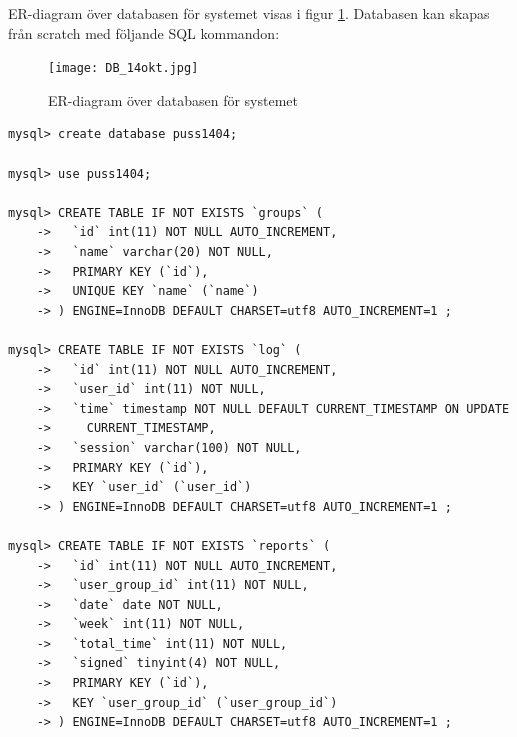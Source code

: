 \documentclass[a4paper]{article}
\begin{document}
ER-diagram över databasen för systemet visas i figur \ref{ER}. Databasen kan skapas från scratch med följande SQL kommandon: \\

\begin{figure}[ht!]
\centering
\texttt{[image: DB\_14okt.jpg]}
\caption{ER-diagram över databasen för systemet \label{ER}}
\end{figure}

\begin{lstlisting}
mysql> create database puss1404;

mysql> use puss1404;

mysql> CREATE TABLE IF NOT EXISTS `groups` (
    ->   `id` int(11) NOT NULL AUTO_INCREMENT,
    ->   `name` varchar(20) NOT NULL,
    ->   PRIMARY KEY (`id`),
    ->   UNIQUE KEY `name` (`name`)
    -> ) ENGINE=InnoDB DEFAULT CHARSET=utf8 AUTO_INCREMENT=1 ;

mysql> CREATE TABLE IF NOT EXISTS `log` (
    ->   `id` int(11) NOT NULL AUTO_INCREMENT,
    ->   `user_id` int(11) NOT NULL,
    ->   `time` timestamp NOT NULL DEFAULT CURRENT_TIMESTAMP ON UPDATE
    ->     CURRENT_TIMESTAMP,
    ->   `session` varchar(100) NOT NULL,
    ->   PRIMARY KEY (`id`),
    ->   KEY `user_id` (`user_id`)
    -> ) ENGINE=InnoDB DEFAULT CHARSET=utf8 AUTO_INCREMENT=1 ;

mysql> CREATE TABLE IF NOT EXISTS `reports` (
    ->   `id` int(11) NOT NULL AUTO_INCREMENT,
    ->   `user_group_id` int(11) NOT NULL,
    ->   `date` date NOT NULL,
    ->   `week` int(11) NOT NULL,
    ->   `total_time` int(11) NOT NULL,
    ->   `signed` tinyint(4) NOT NULL,
    ->   PRIMARY KEY (`id`),
    ->   KEY `user_group_id` (`user_group_id`)
    -> ) ENGINE=InnoDB DEFAULT CHARSET=utf8 AUTO_INCREMENT=1 ;
    

\end{lstlisting}
\end{document}
